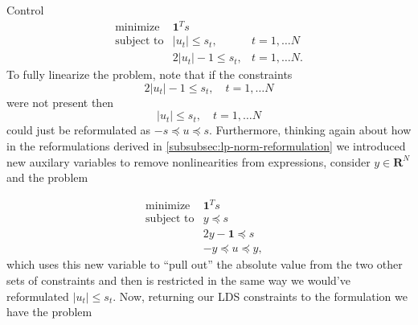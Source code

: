 \begin{chapter}{Control}
    \[\begin{array}{lll}
    \text{minimize} \; & \bm{1}^T s & \\
    \text{subject to} & \left| u_t \right| \le s_t, & t = 1, \ldots N \\
    & 2 \left| u_t \right| - 1 \le s_t, & t = 1, \ldots N.
    \end{array}\]
    To fully linearize the problem, note that if the constraints
    \[ 2 \left| u_t \right| - 1 \le s_t, \quad t = 1, \ldots N\]
    were not present then 
    \[\left| u_t \right| \le s_t, \quad t = 1, \ldots N\]
    could just be reformulated as 
    $-s \preceq u \preceq s$.
    Furthermore, thinking again about how in the reformulations derived in \hyperref[subsubsec:lp-norm-reformulation]{\ref{subsubsec:lp-norm-reformulation}}
    we introduced new auxilary variables to remove nonlinearities from expressions, consider $y \in \mathbf{R}^N$ and the problem

    \[\begin{array}{lll}
    \text{minimize} \; & \bm{1}^T s & \\
    \text{subject to} & y \preceq s & \\
    & 2y - \bm{1} \preceq s \\
    & -y \preceq u \preceq y, & 
    \end{array}\]
    which uses this new variable to ``pull out'' the absolute value from the two other sets
    of constraints and then is restricted in the same way we would've reformulated $\left| u_t \right| \le s_t$.
    Now, returning our LDS constraints to the formulation we have the problem


\end{chapter}
